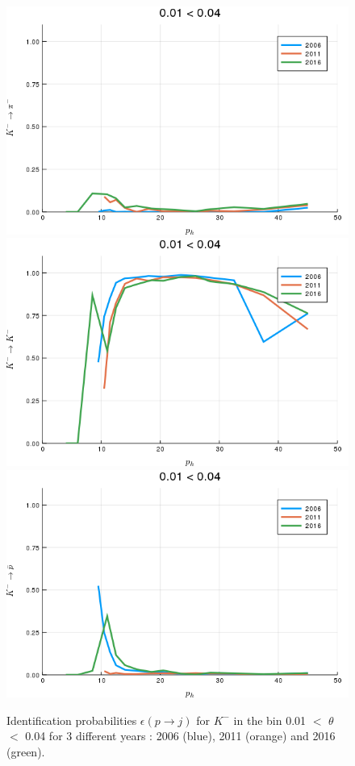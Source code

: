 \begin{figure}[!p]
  \centering
	\includegraphics[scale=0.35]{./gfx/t1/km2pim.png}
  \includegraphics[scale=0.35]{./gfx/t1/km2km.png}
  \includegraphics[scale=0.35]{./gfx/t1/km2pm.png}
	\caption{Identification probabilities $\epsilon(p \rightarrow j)$ for $K^-$ in the bin 0.01 $<$ $\theta$ $<$ 0.04 for 3 different years : 2006 (blue), 2011 (orange) and 2016 (green).}
	\label{pic:compkm}
\end{figure}

